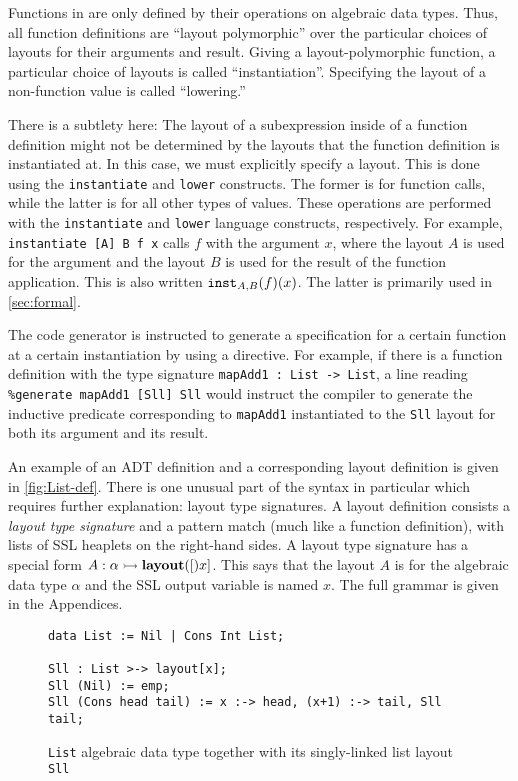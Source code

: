 Functions in \Pika{} are only defined by their operations on algebraic
data types. Thus, all function definitions are ``layout polymorphic''
over the particular choices of layouts for their arguments and result.
Giving a layout-polymorphic function, a particular choice of layouts
is called ``instantiation''. Specifying the layout of a non-function
value is called ``lowering.''

There is a subtlety here: The layout of a subexpression inside of a
function definition might not be determined by the layouts that the
function definition is instantiated at. In this case, we must
explicitly specify a layout. This is done using the \verb|instantiate|
and \verb|lower| constructs. The former is for function calls, while
the latter is for all other types of values. These operations are
performed with the \verb|instantiate| and \verb|lower| language
constructs, respectively. For example, \verb|instantiate [A] B f x|
calls $f$ with the argument $x$, where the layout $A$ is used for the
argument and the layout $B$ is used for the result of the function
application. This is also written $\texttt{inst}_{A,B}(f)(x)$. The
latter is primarily used in \autoref{sec:formal}.

The code generator is instructed to generate a \SuSLik{} specification
for a certain function at a certain instantiation by using a
\generate{} directive. For example, if there is a function definition
with the type signature \verb|mapAdd1 : List -> List|, a line reading
\verb|%generate mapAdd1 [Sll] Sll| would instruct the
\Pika{} compiler to generate the \SuSLik{} inductive predicate
corresponding to \verb|mapAdd1| instantiated to the \verb|Sll| layout
for both its argument and its result.

An example of an ADT definition and a corresponding layout definition
is given in \autoref{fig:List-def}. There is one unusual part of
the syntax in particular which requires further explanation: layout
type signatures. A layout definition consists a \textit{layout type
  signature} and a pattern match (much like a function definition),
with lists of SSL heaplets on the right-hand sides. A layout type
signature has a special form $A : \alpha \rightarrowtail \textbf{layout}([)x]$. This says
that the layout $A$ is for the algebraic data type $\alpha$ and the
SSL output variable is named $x$. The full \Pika{} grammar is given in
the Appendices. %

\begin{figure}[t]
\begin{lstlisting}
data List := Nil | Cons Int List;

Sll : List >-> layout[x];
Sll (Nil) := emp;
Sll (Cons head tail) := x :-> head, (x+1) :-> tail, Sll tail;
\end{lstlisting}
  \caption{\lstinline{List} algebraic data type together with its singly-linked list layout \lstinline{Sll}}
  \label{fig:List-def}
\end{figure}

